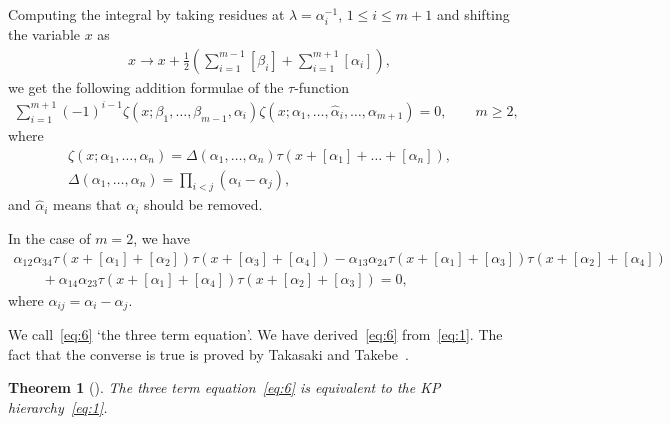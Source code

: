 \documentclass[11pt]{article}
\newtheorem{theorem}{Theorem}
\begin{document}
Computing the integral by taking residues at $\lambda=\alpha_i^{-1}$, $1\le i\le m+1$ \cite{M1} and
shifting the variable $x$ as
\begin{gather*}
x\rightarrow x+\frac{1}{2}\left(\sum_{i=1}^{m-1}[\beta_i]+\sum_{i=1}^{m+1}[\alpha_i]\right),
\end{gather*}
we get the following addition formulae of the $\tau$-function~\cite{SS1}
\begin{gather}
\sum_{i=1}^{m+1}(-1)^{i-1}\zeta(x;\beta_1,\dots,\beta_{m-1},\alpha_i)\zeta(x;\alpha_1,\dots,\hat{\alpha}
_i,\dots,\alpha_{m+1})=0,\qquad  m\ge2,
\label{eq:5}
\end{gather}
where
\begin{gather*}
\zeta(x;\alpha_1,\dots,\alpha_{n})=\Delta(\alpha_1,\dots,\alpha_{n})\tau(x+[\alpha_1]+\dots+[\alpha_{n}]),
\\
\Delta(\alpha_1,\dots,\alpha_n)=\prod_{i<j}(\alpha_i-\alpha_j),
\end{gather*}
and $\hat{\alpha}_i$ means that $\alpha_i$ should be removed.
\begin{example}\label{example1}
In the case of $m=2$, we have
\begin{gather}
\alpha_{12}\alpha_{34}\tau(x+[\alpha_1]+[\alpha_2])\tau(x+[\alpha_3]+[\alpha_4])
-\alpha_{13}\alpha_{24}\tau(x+[\alpha_1]+[\alpha_3])\tau(x+[\alpha_2]+[\alpha_4])
\nonumber
\\
\qquad
{}+\alpha_{14}\alpha_{23}\tau(x+[\alpha_1]+[\alpha_4])\tau(x+[\alpha_2]+[\alpha_3])=0,
\label{eq:6}
\end{gather}
where $\alpha_{ij}=\alpha_i-\alpha_j$.
\end{example}

We call~\eqref{eq:6} `the three term equation'.
We have derived~\eqref{eq:6} from~\eqref{eq:1}.
The fact that the converse is true is proved by Takasaki and Takebe~\cite{TT1}.
\begin{theorem}[\cite{TT1}] \label{theorem1} The three term equation~\eqref{eq:6} is equivalent to the KP hierarchy~\eqref{eq:1}.
\end{theorem}
\end{document}
